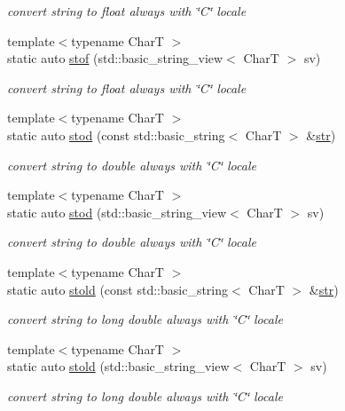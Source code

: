 \begin{DoxyCompactItemize}
\begin{DoxyCompactList}\small\item\em convert string to float always with \char`\"{}\+C\char`\"{} locale \end{DoxyCompactList}\item 
{\footnotesize template$<$typename CharT $>$ }\\static auto \hyperlink{structdevfix_1_1base_1_1strcvt_ad124ced1e4a75974cdf8065985028265}{stof} (std\+::basic\+\_\+string\+\_\+view$<$ CharT $>$ sv)
\begin{DoxyCompactList}\small\item\em convert string to float always with \char`\"{}\+C\char`\"{} locale \end{DoxyCompactList}\item 
{\footnotesize template$<$typename CharT $>$ }\\static auto \hyperlink{structdevfix_1_1base_1_1strcvt_a63350be05c30f4cffee9d8dc8eed54d5}{stod} (const std\+::basic\+\_\+string$<$ CharT $>$ \&\hyperlink{structdevfix_1_1base_1_1strcvt_a22dadaf95d340097e76fb077898578a7}{str})
\begin{DoxyCompactList}\small\item\em convert string to double always with \char`\"{}\+C\char`\"{} locale \end{DoxyCompactList}\item 
{\footnotesize template$<$typename CharT $>$ }\\static auto \hyperlink{structdevfix_1_1base_1_1strcvt_aec0faa61c87e1206ef3a50d5bb197fe7}{stod} (std\+::basic\+\_\+string\+\_\+view$<$ CharT $>$ sv)
\begin{DoxyCompactList}\small\item\em convert string to double always with \char`\"{}\+C\char`\"{} locale \end{DoxyCompactList}\item 
{\footnotesize template$<$typename CharT $>$ }\\static auto \hyperlink{structdevfix_1_1base_1_1strcvt_a387c5ad278f568abb921df0ebac489c3}{stold} (const std\+::basic\+\_\+string$<$ CharT $>$ \&\hyperlink{structdevfix_1_1base_1_1strcvt_a22dadaf95d340097e76fb077898578a7}{str})
\begin{DoxyCompactList}\small\item\em convert string to long double always with \char`\"{}\+C\char`\"{} locale \end{DoxyCompactList}\item 
{\footnotesize template$<$typename CharT $>$ }\\static auto \hyperlink{structdevfix_1_1base_1_1strcvt_acd3c558da236cbab738a9014df5979ac}{stold} (std\+::basic\+\_\+string\+\_\+view$<$ CharT $>$ sv)
\begin{DoxyCompactList}\small\item\em convert string to long double always with \char`\"{}\+C\char`\"{} locale \end{DoxyCompactList}\end{DoxyCompactItemize}


